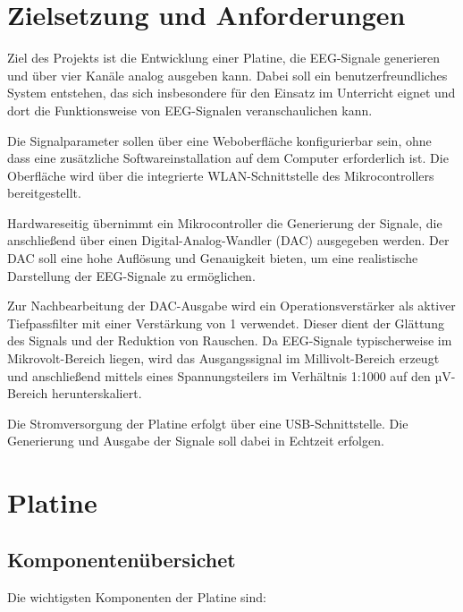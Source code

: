 \section{Zielsetzung und Anforderungen}

Ziel des Projekts ist die Entwicklung einer Platine, die EEG-Signale generieren und über vier Kanäle analog ausgeben kann. Dabei soll ein benutzerfreundliches System entstehen, das sich insbesondere für den Einsatz im Unterricht eignet und dort die Funktionsweise von EEG-Signalen veranschaulichen kann.

Die Signalparameter sollen über eine Weboberfläche konfigurierbar sein, ohne dass eine zusätzliche Softwareinstallation auf dem Computer erforderlich ist. Die Oberfläche wird über die integrierte WLAN-Schnittstelle des Mikrocontrollers bereitgestellt.

Hardwareseitig übernimmt ein Mikrocontroller die Generierung der Signale, die anschließend über einen Digital-Analog-Wandler (DAC) ausgegeben werden. Der DAC soll eine hohe Auflösung und Genauigkeit bieten, um eine realistische Darstellung der EEG-Signale zu ermöglichen.

Zur Nachbearbeitung der DAC-Ausgabe wird ein Operationsverstärker als aktiver Tiefpassfilter mit einer Verstärkung von 1 verwendet. Dieser dient der Glättung des Signals und der Reduktion von Rauschen. Da EEG-Signale typischerweise im Mikrovolt-Bereich liegen, wird das Ausgangssignal im Millivolt-Bereich erzeugt und anschließend mittels eines Spannungsteilers im Verhältnis 1:1000 auf den µV-Bereich herunterskaliert.

Die Stromversorgung der Platine erfolgt über eine USB-Schnittstelle. Die Generierung und Ausgabe der Signale soll dabei in Echtzeit erfolgen.

\section{Platine}

\subsection{Komponentenübersichet}

Die wichtigsten Komponenten der Platine sind:

